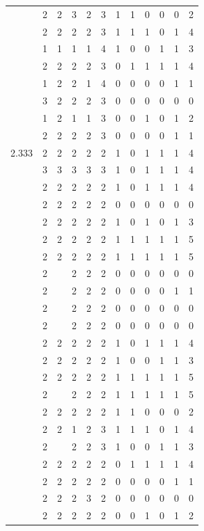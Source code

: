 \documentclass[]{book}
\theoremstyle{definition}
\theoremstyle{definition}
\theoremstyle{definition}
\theoremstyle{remark}
\begin{document}
\begin{table}
{\begin{tabular}[t]{rrrrrrrrrrrr}
 & 2 & 2 & 3 & 2 & 3 & 1 & 1 & 0 & 0 & 0 & 2\\
 & 2 & 2 & 2 & 2 & 3 & 1 & 1 & 1 & 0 & 1 & 4\\
 & 1 & 1 & 1 & 1 & 4 & 1 & 0 & 0 & 1 & 1 & 3\\
 & 2 & 2 & 2 & 2 & 3 & 0 & 1 & 1 & 1 & 1 & 4\\
 & 1 & 2 & 2 & 1 & 4 & 0 & 0 & 0 & 0 & 1 & 1\\
 & 3 & 2 & 2 & 2 & 3 & 0 & 0 & 0 & 0 & 0 & 0\\
 & 1 & 2 & 1 & 1 & 3 & 0 & 0 & 1 & 0 & 1 & 2\\
 & 2 & 2 & 2 & 2 & 3 & 0 & 0 & 0 & 0 & 1 & 1\\
2.333 & 2 & 2 & 2 & 2 & 2 & 1 & 0 & 1 & 1 & 1 & 4\\
 & 3 & 3 & 3 & 3 & 3 & 1 & 0 & 1 & 1 & 1 & 4\\
 & 2 & 2 & 2 & 2 & 2 & 1 & 0 & 1 & 1 & 1 & 4\\
 & 2 & 2 & 2 & 2 & 2 & 0 & 0 & 0 & 0 & 0 & 0\\
 & 2 & 2 & 2 & 2 & 2 & 1 & 0 & 1 & 0 & 1 & 3\\
 & 2 & 2 & 2 & 2 & 2 & 1 & 1 & 1 & 1 & 1 & 5\\
 & 2 & 2 & 2 & 2 & 2 & 1 & 1 & 1 & 1 & 1 & 5\\
 & 2 &  & 2 & 2 & 2 & 0 & 0 & 0 & 0 & 0 & 0\\
 & 2 &  & 2 & 2 & 2 & 0 & 0 & 0 & 0 & 1 & 1\\
 & 2 &  & 2 & 2 & 2 & 0 & 0 & 0 & 0 & 0 & 0\\
 & 2 &  & 2 & 2 & 2 & 0 & 0 & 0 & 0 & 0 & 0\\
 & 2 & 2 & 2 & 2 & 2 & 1 & 0 & 1 & 1 & 1 & 4\\
 & 2 & 2 & 2 & 2 & 2 & 1 & 0 & 0 & 1 & 1 & 3\\
 & 2 & 2 & 2 & 2 & 2 & 1 & 1 & 1 & 1 & 1 & 5\\
 & 2 &  & 2 & 2 & 2 & 1 & 1 & 1 & 1 & 1 & 5\\
 & 2 & 2 & 2 & 2 & 2 & 1 & 1 & 0 & 0 & 0 & 2\\
 & 2 & 2 & 1 & 2 & 3 & 1 & 1 & 1 & 0 & 1 & 4\\
 & 2 &  & 2 & 2 & 3 & 1 & 0 & 0 & 1 & 1 & 3\\
 & 2 & 2 & 2 & 2 & 2 & 0 & 1 & 1 & 1 & 1 & 4\\
 & 2 & 2 & 2 & 2 & 2 & 0 & 0 & 0 & 0 & 1 & 1\\
 & 2 & 2 & 2 & 3 & 2 & 0 & 0 & 0 & 0 & 0 & 0\\
 & 2 & 2 & 2 & 2 & 2 & 0 & 0 & 1 & 0 & 1 & 2\\

\end{tabular}}
\end{table}
\end{document}
